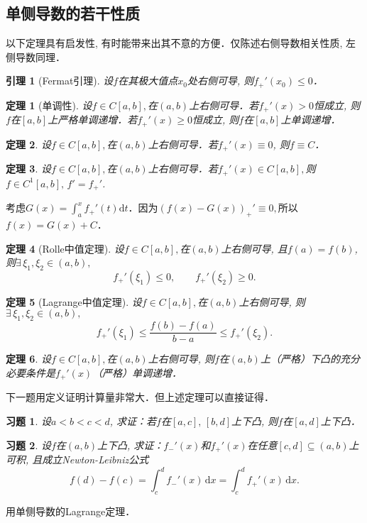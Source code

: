 \documentclass[11pt,a4paper]{ctexart}
\makeatletter
\theoremstyle{thmseries} %
\newtheorem{thm}{定理}[section]
\newtheorem{lem}{引理}[section]
\theoremstyle{exerseries}
\newtheorem{exer}{习题}[section]
\renewenvironment{proof}[1][\proofname]{\par
  \pushQED{\qed}%
  \normalfont \topsep6\p@\@plus6\p@\relax
  \trivlist
  \item[\hskip\labelsep
        \itshape
    #1\@addpunct{}]\ignorespaces
}{%
  \popQED\endtrivlist\@endpefalse
}
\newenvironment{pf}{\begin{proof}[\bfseries\upshape 证\quad]}{\end{proof}}
\newcommand{\bra}[1]{\mathopen{}\left(#1\right)}
\renewcommand{\d}{\mathrm{d}}
\makeatother
\begin{document}
\subsection{单侧导数的若干性质}
以下定理具有启发性, 有时能带来出其不意的方便．仅陈述右侧导数相关性质, 左侧导数同理．
\begin{lem}[Fermat引理]
	设$f$在其极大值点$x_0$处右侧可导, 则$f_+'(x_0)\leq0$．
\end{lem}

\begin{thm}[单调性]
	设$f\in C[a,b],$在$(a,b)$上右侧可导．若$f_+'(x)>0$恒成立, 则$f$在$[a,b]$上严格单调递增．若$f_+'(x)\geq0$恒成立, 则$f$在$[a,b]$上单调递增．
\end{thm}

\begin{thm}
	设$f\in C[a,b],$在$(a,b)$上右侧可导．若$f_+'(x)\equiv0$, 则$f\equiv C$．
\end{thm}

\begin{thm}
	设$f\in C[a,b],$在$(a,b)$上右侧可导．若$f_+'(x)\in C[a,b],$则$f\in C^1[a,b],\,f'=f_+'$.
\end{thm}
\begin{pf}
	考虑$G(x)=\int_{a}^{x}f_+'(t)\d t$．因为$\bra{f(x)-G(x)}_+'\equiv0,$所以$f(x)=G(x)+C$．
\end{pf}

\begin{thm}[Rolle中值定理]
	设$f\in C[a,b],$在$(a,b)$上右侧可导, 且$f(a)=f(b)$, 则$\exists\,\xi_1,\xi_2\in(a,b),$
	\[f_+'(\xi_1)\leq0,\qquad f_+'(\xi_2)\geq0.\]
\end{thm}

\begin{thm}[Lagrange中值定理]
	设$f\in C[a,b],$在$(a,b)$上右侧可导, 则$\exists\,\xi_1,\xi_2\in(a,b),$
	\[f_+'(\xi_1)\leq\frac{f(b)-f(a)}{b-a}\leq f_+'(\xi_2).\]
\end{thm}

\begin{thm}
	设$f\in C[a,b],$在$(a,b)$上右侧可导, 则$f$在$(a,b)$上（严格）下凸的充分必要条件是$f_+'(x)$（严格）单调递增．
\end{thm}

下一题用定义证明计算量非常大．但上述定理可以直接证得．
\begin{exer}
	设$a<b<c<d$, 求证：若$f$在$[a,c],\,[b,d]$上下凸, 则$f$在$[a,d]$上下凸．
\end{exer}

\begin{exer}
	设$f$在$(a,b)$上下凸, 求证：$f_-'(x)$和$f_+'(x)$在任意$[c,d]\subseteq(a,b)$上可积, 且成立Newton-Leibniz公式
	\[f(d)-f(c)=\int_{c}^{d}f_-'(x)\,\d x=\int_{c}^{d}f_+'(x)\,\d x.\]
\end{exer}
\begin{pf}
	用单侧导数的Lagrange定理．
\end{pf}
\end{document}

